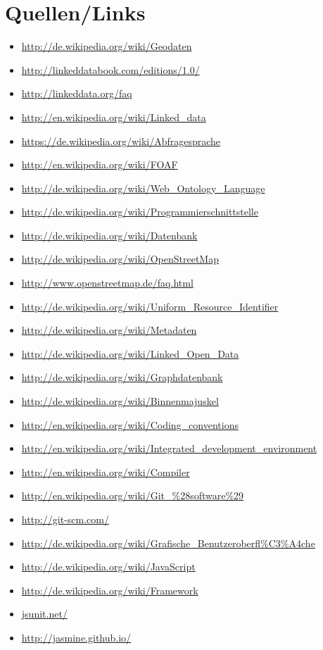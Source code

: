 \documentclass[11pt,a4paper]{article}
\begin{document}
\section{Quellen/Links}
\begin{itemize}
\item \url{http://de.wikipedia.org/wiki/Geodaten}
\item \url{http://linkeddatabook.com/editions/1.0/}
\item \url{http://linkeddata.org/faq}
\item \url{http://en.wikipedia.org/wiki/Linked_data}
\item \url{https://de.wikipedia.org/wiki/Abfragesprache}
\item \url{http://en.wikipedia.org/wiki/FOAF}
\item \url{http://de.wikipedia.org/wiki/Web_Ontology_Language}
\item \url{http://de.wikipedia.org/wiki/Programmierschnittstelle}
\item \url{http://de.wikipedia.org/wiki/Datenbank}
\item \url{http://de.wikipedia.org/wiki/OpenStreetMap}
\item \url{http://www.openstreetmap.de/faq.html}
\item \url{http://de.wikipedia.org/wiki/Uniform_Resource_Identifier}
\item \url{http://de.wikipedia.org/wiki/Metadaten}
\item \url{http://de.wikipedia.org/wiki/Linked_Open_Data}
\item \url{http://de.wikipedia.org/wiki/Graphdatenbank}
\item \url{http://de.wikipedia.org/wiki/Binnenmajuskel}
\item \url{http://en.wikipedia.org/wiki/Coding_conventions}
\item \url{http://en.wikipedia.org/wiki/Integrated_development_environment}
\item \url{http://en.wikipedia.org/wiki/Compiler}
\item \url{http://en.wikipedia.org/wiki/Git_%28software%29}
\item \url{http://git-scm.com/}
\item \url{http://de.wikipedia.org/wiki/Grafische_Benutzeroberfl%C3%A4che}
\item \url{http://de.wikipedia.org/wiki/JavaScript}
\item \url{http://de.wikipedia.org/wiki/Framework}
\item \url{jsunit.net/}
\item \url{http://jasmine.github.io/}

\end{itemize}
\end{document}
